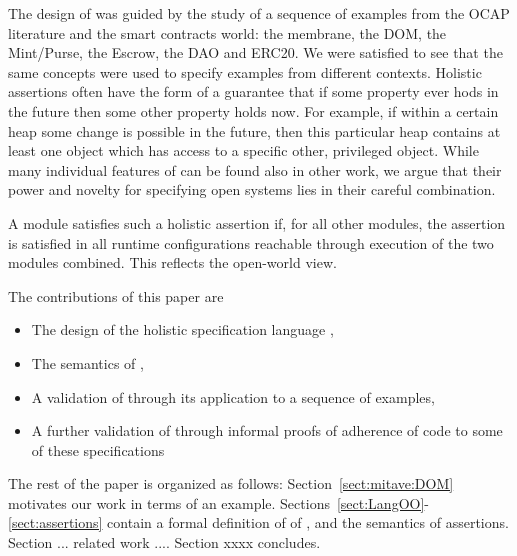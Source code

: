 The design of \Chainmail was guided by the study of a sequence of examples from the OCAP literature and the 
smart contracts world: the membrane, the DOM, the Mint/Purse, the Escrow, the DAO and ERC20. 
We were satisfied to see that the same concepts were used to specify examples from  different contexts.
Holistic assertions often have the form of a guarantee
 that if some property ever hods in the future then some other property holds now.
For example, if within a certain heap some change is possible in the future, then this particular heap contains 
at least one object which has access to a specific other, privileged object.
%
While many individual features of \Chainmail can be found also in other work, 
we argue that their power and novelty for specifying open systems lies in their careful combination.
{}
 
A module satisfies such a holistic assertion if, for all other modules,
  the assertion is satisfied  in all runtime configurations reachable through execution of the two modules combined.
  This reflects the open-world view.
  
The contributions of this paper are
\begin{itemize}
\item The design of the holistic specification language \Chainmail,
\item The semantics of \Chainmail,
\item A validation of \Chainmail through its application to a sequence of examples,
\item A further validation of \Chainmail through informal proofs of adherence of code to some of these specifications
\end{itemize}  
  
  
The rest of the paper is organized as follows: Section~\ref{sect:mitave:DOM} 
motivates our work in terms of an example. Sections~\ref{sect:LangOO}-\ref{sect:assertions} contain a formal definition of of \LangOO, and the semantics of assertions. Section ... related work .... Section xxxx concludes.

